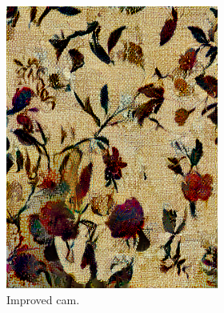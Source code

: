 \begin{figure}[]
\begin{subfigure}{\textwidth}
\begin{subfigure}{0.24\textwidth}
            \includegraphics[width=\textwidth]{images/04-experiment02/human/flowers2/improved_proj.jpg}
            \caption*{Improved cam.}
        \end{subfigure}
        \hfill
        \begin{subfigure}{0.24\textwidth}
            \centering

\end{subfigure}
\end{subfigure}
\end{figure}
